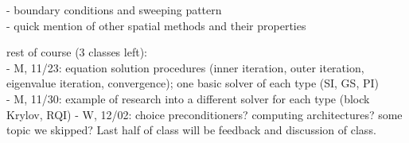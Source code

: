 \documentclass[12pt]{article}
\begin{document}
- boundary conditions and sweeping  pattern\\
- quick mention of other spatial methods and their properties


rest of course (3 classes left):\\
- M, 11/23: equation solution procedures (inner iteration, outer iteration, eigenvalue iteration, convergence); one basic solver of each type (SI, GS, PI)\\ 
- M, 11/30: example of research into a different solver for each type (block Krylov, RQI)
- W, 12/02: choice preconditioners? computing architectures? some topic we skipped? Last half of class will be feedback and discussion of class.
\end{document}
